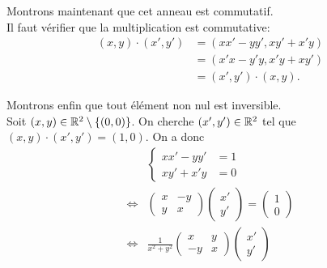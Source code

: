 {\begin{td-sol}[]
        \ptr{} Montrons maintenant que cet anneau est commutatif.\\
        Il faut vérifier que la multiplication est commutative:
        \begin{equation*}
            \begin{aligned}
                (x,y) \cdot (x',y') &= (xx'-yy',xy'+x'y)\\
                &= (x'x-y'y,x'y+xy')\\
                &= (x',y') \cdot (x,y).
            \end{aligned}
        \end{equation*}

        \ptr{} Montrons enfin que tout élément non nul est inversible.\\
        Soit \((x,y) \in \mathbb{R}^2\setminus\{(0,0)\}\). On cherche \((x',y') \in \mathbb{R}^2\) tel que \((x,y) \cdot (x',y') = (1,0)\). On a donc
        \begin{equation*}
            \begin{aligned}
                &\begin{cases}
                    xx'-yy' &= 1\\
                    xy'+x'y &= 0
                \end{cases}\\
                \iff &\begin{pmatrix}
                    x & -y\\
                    y & x
                \end{pmatrix}
                \begin{pmatrix}
                    x'\\
                    y'
                \end{pmatrix}
                = \begin{pmatrix}
                    1\\
                    0
                \end{pmatrix}\\
                \iff & \frac{1}{x^2+y^2}\begin{pmatrix}
                    x & y\\
                    -y & x
                \end{pmatrix}
                \begin{pmatrix}
                    x'\\
                    y'
                \end{pmatrix}

\end{aligned}
\end{equation*}
\end{td-sol}}
